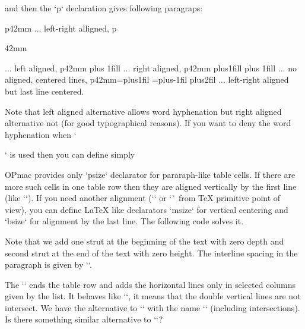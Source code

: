 \begtt
\let\fL=\raggedright 
\def\fR{\leftskip=0pt plus 1fill} 
\def\fC{\leftskip=0pt plus1fill \rightskip=0pt plus 1fill} 
\def\fX{\leftskip=\iindent plus1fil 
        \rightskip=\iindent plus-1fil 
        \parfillskip=0pt plus2fil} 
\endtt


and then the `p` declaration gives following paragraps: 

\begtt
p{42mm}     ... left-right alligned, 
p{42mm\fL}  ... left aligned, 
p{42mm\fR}  ... right aligned, 
p{42mm\fC}  ... no aligned, centered lines, 
p{42mm\fX}  ... left-right aligned but last line centered. 
\endtt


Note that left aligned alternative allows word hyphenation but right aligned alternative not (for good typographical reasons). If you want to deny the word hyphenation when `\fL` is used then you can define simply 

\begtt
\def\fL{\rightskip=0pt plus 1fil} 
\endtt

 


OPmac provides only `p{size}` declarator for pararaph-like table cells. If there are more such cells in one table row then they are aligned vertically by the first line (like `\vtop`). If you need another alignment (`\vcenter` or `\vbox` from TeX primitive point of view), you can define LaTeX like declarators `m{size}` for vertical centering and `b{size}` for alignment by the last line. The following code solves it. 

\begtt
\def\paramtabdeclarem#1{\tabiteml{$\vcenter{\hsize=#1\relax 
   \baselineskip=\normalbaselineskip \lineskiplimit=0pt 
   \noindent\vbox{\hbox{\tabstrutA}\kern-\prevdepth}##\unsskip 
   \vbox to0pt{\vss\hbox{\tabstrutA}}}$}\tabitemr 
} 
\def\paramtabdeclareb#1{\tabiteml\vbox{\hsize=#1\relax 
   \baselineskip=\normalbaselineskip \lineskiplimit=0pt 
   \noindent\vbox{\hbox{\tabstrutA}\kern-\prevdepth}##\unsskip}\tabitemr 
} 
\endtt


Note that we add one strut at the beginning of the text with zero depth and second strut at the end of the text with zero height. The interline spacing in the paragraph is given by `\normalbaselineskip`. 


 


The `` ends the table row and adds the horizontal lines only in selected columns given by the list. It behaves like `\crli`, it means that the double vertical lines are not intersect. We have the alternative to `\crli` with the name `\crl` (including intersections). Is there something similar alternative to `\crlp`? 




